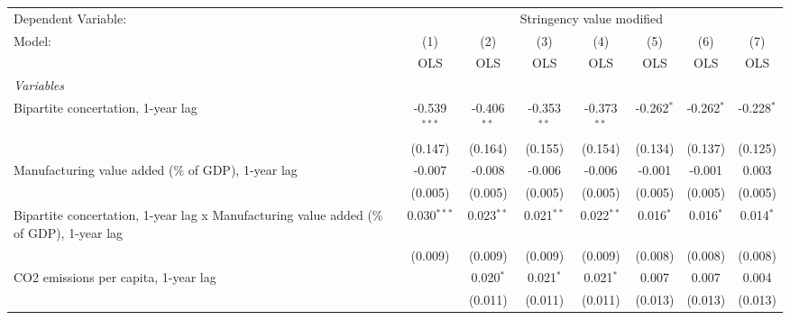 
\begingroup
\centering
\begin{tabular}{lccccccc}
   \toprule
   Dependent Variable: & \multicolumn{7}{c}{Stringency value modified}\\
   Model:                                                                                  & (1)            & (2)           & (3)           & (4)           & (5)          & (6)          & (7)\\  
                                                                                           &  OLS           & OLS           & OLS           & OLS           & OLS          & OLS          & OLS\\  
   \midrule
   \emph{Variables}\\
   Bipartite concertation, 1-year lag                                                      & -0.539$^{***}$ & -0.406$^{**}$ & -0.353$^{**}$ & -0.373$^{**}$ & -0.262$^{*}$ & -0.262$^{*}$ & -0.228$^{*}$\\   
                                                                                           & (0.147)        & (0.164)       & (0.155)       & (0.154)       & (0.134)      & (0.137)      & (0.125)\\   
   Manufacturing value added (\% of GDP), 1-year lag                                       & -0.007         & -0.008        & -0.006        & -0.006        & -0.001       & -0.001       & 0.003\\   
                                                                                           & (0.005)        & (0.005)       & (0.005)       & (0.005)       & (0.005)      & (0.005)      & (0.005)\\   
   Bipartite concertation, 1-year lag x Manufacturing value added (\% of GDP), 1-year lag  & 0.030$^{***}$  & 0.023$^{**}$  & 0.021$^{**}$  & 0.022$^{**}$  & 0.016$^{*}$  & 0.016$^{*}$  & 0.014$^{*}$\\   
                                                                                           & (0.009)        & (0.009)       & (0.009)       & (0.009)       & (0.008)      & (0.008)      & (0.008)\\   
   CO2 emissions per capita, 1-year lag                                                    &                & 0.020$^{*}$   & 0.021$^{*}$   & 0.021$^{*}$   & 0.007        & 0.007        & 0.004\\   
                                                                                           &                & (0.011)       & (0.011)       & (0.011)       & (0.013)      & (0.013)      & (0.013)\\   

\end{tabular}
